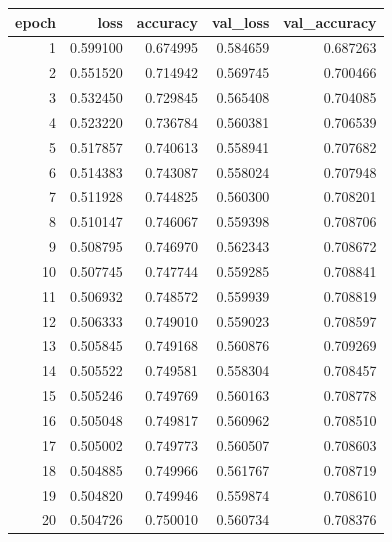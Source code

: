 \begin{tabular}{rrrrr}
\toprule
epoch & loss & accuracy & val_loss & val_accuracy \\
\midrule
1 & 0.599100 & 0.674995 & 0.584659 & 0.687263 \\
2 & 0.551520 & 0.714942 & 0.569745 & 0.700466 \\
3 & 0.532450 & 0.729845 & 0.565408 & 0.704085 \\
4 & 0.523220 & 0.736784 & 0.560381 & 0.706539 \\
5 & 0.517857 & 0.740613 & 0.558941 & 0.707682 \\
6 & 0.514383 & 0.743087 & 0.558024 & 0.707948 \\
7 & 0.511928 & 0.744825 & 0.560300 & 0.708201 \\
8 & 0.510147 & 0.746067 & 0.559398 & 0.708706 \\
9 & 0.508795 & 0.746970 & 0.562343 & 0.708672 \\
10 & 0.507745 & 0.747744 & 0.559285 & 0.708841 \\
11 & 0.506932 & 0.748572 & 0.559939 & 0.708819 \\
12 & 0.506333 & 0.749010 & 0.559023 & 0.708597 \\
13 & 0.505845 & 0.749168 & 0.560876 & 0.709269 \\
14 & 0.505522 & 0.749581 & 0.558304 & 0.708457 \\
15 & 0.505246 & 0.749769 & 0.560163 & 0.708778 \\
16 & 0.505048 & 0.749817 & 0.560962 & 0.708510 \\
17 & 0.505002 & 0.749773 & 0.560507 & 0.708603 \\
18 & 0.504885 & 0.749966 & 0.561767 & 0.708719 \\
19 & 0.504820 & 0.749946 & 0.559874 & 0.708610 \\
20 & 0.504726 & 0.750010 & 0.560734 & 0.708376 \\
\bottomrule
\end{tabular}
